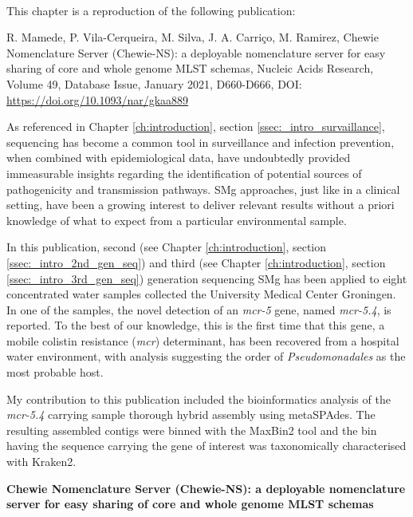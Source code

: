 \mbox{}\\
\vspace{8cm}

This chapter is a reproduction of the following publication:

R. Mamede, P. Vila-Cerqueira, M. Silva, J. A. Carriço, M. Ramirez, Chewie Nomenclature Server (Chewie-NS): a deployable nomenclature server for easy sharing of core and whole genome MLST schemas, Nucleic Acids Research, Volume 49, Database Issue, January 2021, D660-D666, DOI: \url{https://doi.org/10.1093/nar/gkaa889}

As referenced in Chapter \ref{ch:introduction}, section \ref{ssec:_intro_survaillance}, sequencing has become a common tool in surveillance and infection prevention, when combined with epidemiological data, have undoubtedly provided immeasurable insights regarding the identification of potential sources of pathogenicity and transmission pathways. SMg approaches, just like in a clinical setting, have been a growing interest to deliver relevant results without a priori knowledge of what to expect from a particular environmental sample. 

In this publication, second (see Chapter \ref{ch:introduction}, section \ref{ssec:_intro_2nd_gen_seq}) and third (see Chapter \ref{ch:introduction}, section \ref{ssec:_intro_3rd_gen_seq}) generation sequencing SMg has been applied to eight concentrated water samples collected the University Medical Center Groningen. In one of the samples, the novel detection of an \textit{mcr-5} gene, named \textit{mcr-5.4}, is reported. To the best of our knowledge, this is the first time that this gene, a mobile colistin resistance (\textit{mcr}) determinant, has been recovered from a hospital water environment, with analysis suggesting the order of \textit{Pseudomonadales} as the most probable host. 

My contribution to this publication included the bioinformatics analysis of the \textit{mcr-5.4} carrying sample thorough hybrid assembly using metaSPAdes. The resulting assembled contigs were binned with the MaxBin2 tool and the bin having the sequence carrying the gene of interest was taxonomically characterised with Kraken2.

\cleardoublepage 

\begin{center}
\large
\textbf{Chewie Nomenclature Server (Chewie-NS): a deployable nomenclature server for easy sharing of core and whole genome MLST schemas}
\end{center}

